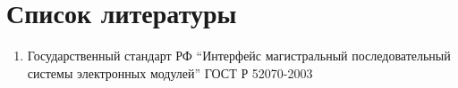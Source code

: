 \section {Список литературы}

\begin{enumerate}
 \sloppy
 \item \label{gost_r_52070-2003} Государственный стандарт РФ ``Интерфейс 
магистральный последовательный системы электронных модулей'' ГОСТ Р 52070-2003
\end{enumerate}
